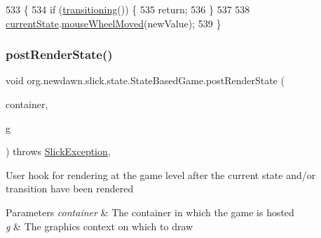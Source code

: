 \begin{DoxyCode}
533                                               \{
534         \textcolor{keywordflow}{if} (\mbox{\hyperlink{classorg_1_1newdawn_1_1slick_1_1state_1_1_state_based_game_ae869c08778875776081935a090d4c92f}{transitioning}}()) \{
535             \textcolor{keywordflow}{return};
536         \}
537         
538         \mbox{\hyperlink{classorg_1_1newdawn_1_1slick_1_1state_1_1_state_based_game_a6a45e68094bb9b7ec30b8a8b7d415766}{currentState}}.\mbox{\hyperlink{interfaceorg_1_1newdawn_1_1slick_1_1_mouse_listener_ad7e49c969e1f0315ecdf238f715953d1}{mouseWheelMoved}}(newValue);
539     \}
\end{DoxyCode}
\mbox{\label{classorg_1_1newdawn_1_1slick_1_1state_1_1_state_based_game_af5ecc0b6b725fb12bfe005e6310a9bc3}} 
\subsubsection{\texorpdfstring{post\+Render\+State()}{postRenderState()}}
{\footnotesize\ttfamily void org.\+newdawn.\+slick.\+state.\+State\+Based\+Game.\+post\+Render\+State (\begin{DoxyParamCaption}\item[{\mbox{\hyperlink{classorg_1_1newdawn_1_1slick_1_1_game_container}{Game\+Container}}}]{container,  }\item[{\mbox{\hyperlink{classorg_1_1newdawn_1_1slick_1_1_graphics}{Graphics}}}]{g }\end{DoxyParamCaption}) throws \mbox{\hyperlink{classorg_1_1newdawn_1_1slick_1_1_slick_exception}{Slick\+Exception}}\hspace{0.3cm}{\ttfamily [inline]}, {\ttfamily [protected]}}

User hook for rendering at the game level after the current state and/or transition have been rendered


\begin{DoxyParams}{Parameters}
{\em container} & The container in which the game is hosted \\
\hline
{\em g} & The graphics context on which to draw \\
\hline
\end{DoxyParams}


